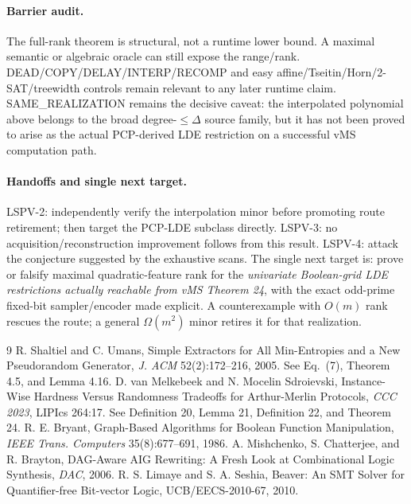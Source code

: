 \documentclass[11pt]{article}
\begin{document}
\paragraph{Barrier audit.}
The full-rank theorem is structural, not a runtime lower bound. A maximal semantic or algebraic oracle can still expose the range/rank. DEAD/COPY/DELAY/INTERP/RECOMP and easy affine/Tseitin/Horn/2-SAT/treewidth controls remain relevant to any later runtime claim. SAME\_REALIZATION remains the decisive caveat: the interpolated polynomial above belongs to the broad degree-$\le\Delta$ source family, but it has not been proved to arise as the actual PCP-derived LDE restriction on a successful vMS computation path.

\paragraph{Handoffs and single next target.}
LSPV-2: independently verify the interpolation minor before promoting route retirement; then target the PCP-LDE subclass directly. LSPV-3: no acquisition/reconstruction improvement follows from this result. LSPV-4: attack the conjecture suggested by the exhaustive scans. The single next target is: prove or falsify maximal quadratic-feature rank for the \emph{univariate Boolean-grid LDE restrictions actually reachable from vMS Theorem 24}, with the exact odd-prime fixed-bit sampler/encoder made explicit. A counterexample with $O(m)$ rank rescues the route; a general $\Omega(m^2)$ minor retires it for that realization.

\begin{thebibliography}{9}
 R. Shaltiel and C. Umans, Simple Extractors for All Min-Entropies and a New Pseudorandom Generator, \emph{J. ACM} 52(2):172--216, 2005. See Eq.~(7), Theorem 4.5, and Lemma 4.16.
 D. van Melkebeek and N. Mocelin Sdroievski, Instance-Wise Hardness Versus Randomness Tradeoffs for Arthur-Merlin Protocols, \emph{CCC 2023}, LIPIcs 264:17. See Definition 20, Lemma 21, Definition 22, and Theorem 24.
 R. E. Bryant, Graph-Based Algorithms for Boolean Function Manipulation, \emph{IEEE Trans. Computers} 35(8):677--691, 1986.
 A. Mishchenko, S. Chatterjee, and R. Brayton, DAG-Aware AIG Rewriting: A Fresh Look at Combinational Logic Synthesis, \emph{DAC}, 2006.
 R. S. Limaye and S. A. Seshia, Beaver: An SMT Solver for Quantifier-free Bit-vector Logic, UCB/EECS-2010-67, 2010.
\end{thebibliography}
\end{document}
